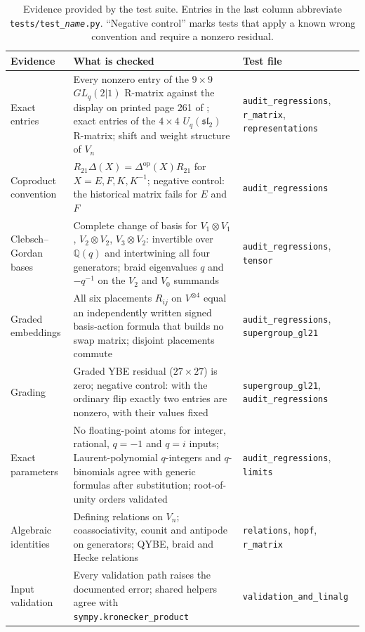 \documentclass[11pt,a4paper]{article}
\newcommand{\code}[1]{\texttt{#1}}
\newcommand{\Uq}{U_q(\mathfrak{sl}_2)}
\newcommand{\GL}{GL_q(2|1)}
\begin{document}
\begin{table}[t]
\centering
\caption{Evidence provided by the test suite. Entries in the last column abbreviate \code{tests/test\_\textit{name}.py}. ``Negative control'' marks tests that apply a known wrong convention and require a nonzero residual.}
\label{tab:qc}
\small
\begin{tabularx}{\textwidth}{@{}>{\raggedright\arraybackslash}p{}>{\raggedright\arraybackslash}X>{\raggedright\arraybackslash}p{}@{}}
\toprule
Evidence & What is checked & Test file \\
\midrule
Exact entries & Every nonzero entry of the $9\times9$ $\GL$ R-matrix against the display on printed page 261 of \cite{celik2021}; exact entries of the $4\times4$ $\Uq$ R-matrix; shift and weight structure of $V_n$ & \code{audit\_regressions}, \code{r\_matrix}, \code{representations} \\
Coproduct convention & $R_{21}\Delta(X)=\Delta^{\mathrm{op}}(X)R_{21}$ for $X=E,F,K,K^{-1}$; negative control: the historical matrix fails for $E$ and $F$ & \code{audit\_regressions} \\
Clebsch--Gordan bases & Complete change of basis for $V_1\otimes V_1$, $V_2\otimes V_2$, $V_3\otimes V_2$: invertible over $\mathbb{Q}(q)$ and intertwining all four generators; braid eigenvalues $q$ and $-q^{-1}$ on the $V_2$ and $V_0$ summands & \code{audit\_regressions}, \code{tensor} \\
Graded embeddings & All six placements $R_{ij}$ on $V^{\otimes4}$ equal an independently written signed basis-action formula that builds no swap matrix; disjoint placements commute & \code{audit\_regressions}, \code{supergroup\_gl21} \\
Grading & Graded YBE residual ($27\times27$) is zero; negative control: with the ordinary flip exactly two entries are nonzero, with their values fixed & \code{supergroup\_gl21}, \code{audit\_regressions} \\
Exact parameters & No floating-point atoms for integer, rational, $q=-1$ and $q=i$ inputs; Laurent-polynomial $q$-integers and $q$-binomials agree with generic formulas after substitution; root-of-unity orders validated & \code{audit\_regressions}, \code{limits} \\
Algebraic identities & Defining relations on $V_n$; coassociativity, counit and antipode on generators; QYBE, braid and Hecke relations & \code{relations}, \code{hopf}, \code{r\_matrix} \\
Input validation & Every validation path raises the documented error; shared helpers agree with \code{sympy.kronecker\_product} & \code{validation\_and\_\allowbreak linalg} \\
\bottomrule
\end{tabularx}
\end{table}
\end{document}
